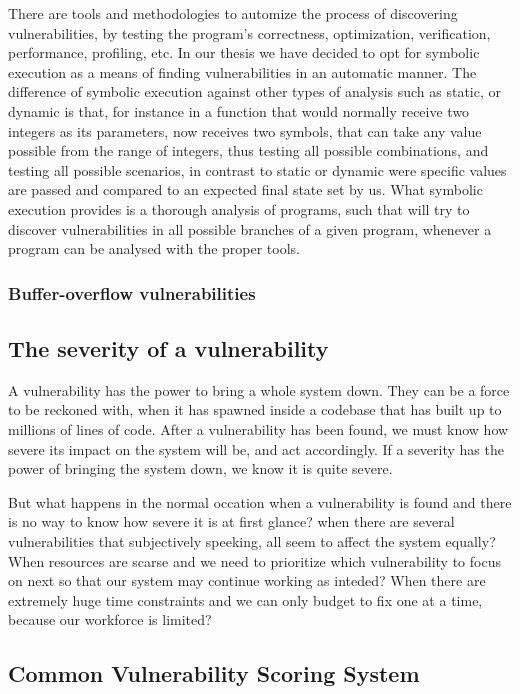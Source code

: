 There are tools and methodologies to automize the process of discovering vulnerabilities, by testing the program's correctness, optimization, verification, performance, profiling, etc. In our thesis we have decided to opt for symbolic execution as a means of finding vulnerabilities in an automatic manner. The difference of symbolic execution against other types of analysis such as static, or dynamic is that, for instance in a function that would normally receive two integers as its parameters, now receives two symbols, that can take any value possible from the range of integers, thus testing all possible combinations, and testing all possible scenarios, in contrast to static or dynamic were specific values are passed and compared to an expected final state set by us. What symbolic execution provides is a thorough analysis of programs, such that will try to discover vulnerabilities in all possible branches of a given program, whenever a program can be analysed with the proper tools.

\subsubsection{Buffer-overflow vulnerabilities}


\subsection{The severity of a vulnerability}

A vulnerability has the power to bring a whole system down. They can be a force to be reckoned with, when it has spawned inside a codebase that has built up to millions of lines of code. After a vulnerability has been found, we must know how severe its impact on the system will be, and act accordingly. If a severity has the power of bringing the system down, we know it is quite severe. 

But what happens in the normal occation when a vulnerability is found and there is no way to know how severe it is at first glance? when there are several vulnerabilities that subjectively speeking, all seem to affect the system equally? When resources are scarse and we need to prioritize which vulnerability to focus on next so that our system may continue working as inteded?
When there are extremely huge time constraints and we can only budget to fix one at a time, because our workforce is limited?

\subsection{Common Vulnerability Scoring System}

